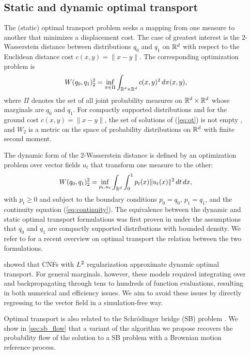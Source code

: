 \documentclass[10pt]{article}
\theoremstyle{plain}
\theoremstyle{definition}
\theoremstyle{remark}
\begin{document}
\subsection{Static and dynamic optimal transport}

The (static) optimal transport problem seeks a mapping from one measure to another that minimizes a displacement cost. The case of greatest interest is the $2$-Wasserstein distance between distributions $q_0$ and $q_1$ on $\mathbb{R}^d$ with respect to the Euclidean distance cost $c(x,y)=\|x-y\|$. The corresponding optimization problem is
\begin{equation}\label{eq:ot}
W(q_0, q_1)_2^2 = \inf_{\pi \in \Pi} \int_{\mathbb{R}^d \times \mathbb{R}^d} c(x, y)^2\,d\pi(x, y),
\end{equation}
where $\Pi$ denotes the set of all joint probability measures on $\mathbb{R}^d\times\mathbb{R}^d$ whose marginals are $q_0$ and $q_1$. For compactly supported distributions and for the ground cost $c(x,y)=\|x-y\|$, the set of solutions of (\ref{eq:ot}) is not empty \cite{Villani(2009)}, and $W_2$ is a metric on the space of probability distributions on $\mathbb{R}^d$ with finite second moment.

The dynamic form of the 2-Wasserstein distance is defined by an optimization problem over vector fields $u_t$ that transform one measure to the other:
\begin{equation}\label{eq:dot}
W(q_0, q_1)^2_2 = \inf_{p_t, u_t} \int_{\mathbb{R}^d} \int_0^1 p_t(x) \|u_t(x) \|^2\,dt\,dx,
\end{equation}
with $p_t \ge 0$ and subject to the boundary conditions $p_0 = q_0$, $p_1 = q_1$, and the continuity equation (\ref{eq:continuity}). The equivalence between the dynamic and static optimal transport formulations was first proven in \cite{Benamou(2000)} under the assumptions that $q_0$ and $q_1$ are compactly supported distributions with bounded density. We refer to \cite[Chapter2]{Ambrosio2013} for a recent overview on optimal transport the relation between the two formulations.

\citet{tong_trajectorynet_2020, finlay_how_2020} showed that CNFs with $L^2$ regularization approximate dynamic optimal transport. For general marginals, however, these models required integrating over and backpropagating through tens to hundreds of function evaluations, resulting in both numerical and efficiency issues. We aim to avoid these issues by directly regressing to the vector field in a simulation-free way.

Optimal transport is also related to the Schr\"odinger bridge (SB) problem \citep{leonard_schrodinger}. We show in \autoref{sec:sb_flow} that a variant of the algorithm we propose recovers the probability flow of the solution to a SB problem with a Brownian motion reference process.
\end{document}
